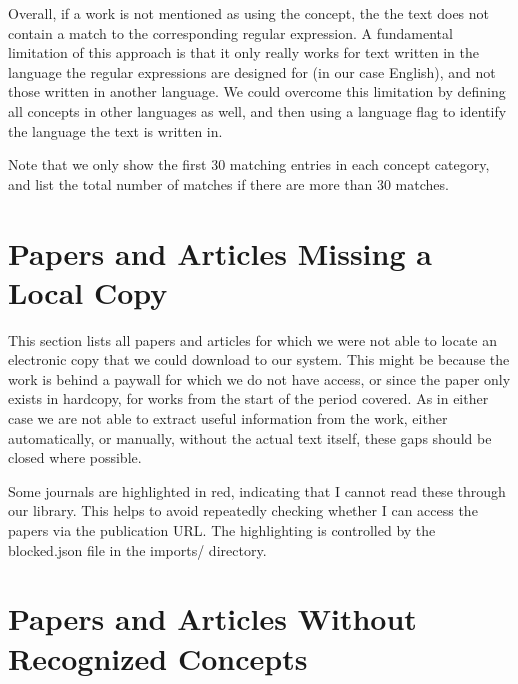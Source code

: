 \documentclass[a4paper]{article}
\begin{document}
Overall, if a work is not mentioned as using the concept, the the text does not contain a match to the corresponding regular expression. A fundamental limitation of this approach is that it only really works for text written in the language the regular expressions are designed for (in our case English), and not those written in another language. We could overcome this limitation by defining all concepts in other languages as well, and then using a language flag to identify the language the text is written in. 

Note that we only show the first 30 matching entries in each concept category, and list the total number of matches if there are more than 30 matches.





\clearpage
{}
{}





\appendix
\clearpage
\section{Papers and Articles Missing a Local Copy}

This section lists all papers and articles for which we were not able to locate an electronic copy that we could download to our system. This might be because the work is behind a paywall for which we do not have access, or since the paper only exists in hardcopy, for works from the start of the period covered. As in either case we are not able to extract useful information from the work, either automatically, or manually, without the actual text itself, these gaps should be closed where possible.

Some journals are highlighted in red, indicating that I cannot read these through our library. This helps to avoid repeatedly checking whether I can access the papers via the publication URL. The highlighting is controlled by the blocked.json file in the imports/ directory.









\clearpage
\section{Papers and Articles Without Recognized Concepts}
\end{document}
